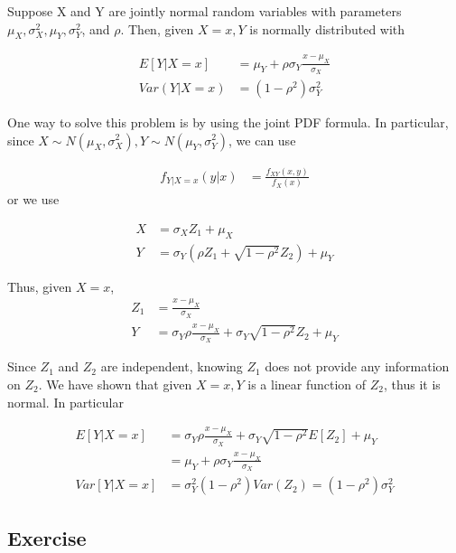 \begin{theorem}
Suppose X and Y are jointly normal random variables with parameters $\mu_X, \sigma^2_X, \mu_Y, \sigma^2_Y$, and $ \rho $. Then, given $X=x, Y$ is normally distributed with

\begin{align*}
	E[Y|X=x] &= \mu_Y + \rho \sigma_Y \frac{x-\mu_X}{\sigma_X} \\
	Var(Y|X=x) &= (1- \rho^2) \sigma^2_Y
\end{align*}

\end{theorem}

One way to solve this problem is by using the joint PDF formula. In particular, since $X \sim N(\mu_X, \sigma^2_X), Y \sim N(\mu_Y, \sigma^2_Y)$, we can use

\begin{align*}
	f_{Y|X=x} (y|x) &= \frac{f_{XY} (x, y)}{f_X(x)}
\end{align*}
or we use

\begin{align*}
	X &= \sigma_X Z_1 + \mu_X \\
	Y &= \sigma_Y \left(\rho Z_1 + \sqrt{1-\rho^2} Z_2 \right)  + \mu_Y
\end{align*}

Thus, given $X=x$, 
\begin{align*}
	Z_1 &= \frac{x - \mu_X}{\sigma_X} \\
	Y &= \sigma_Y \rho \frac{x- \mu_X}{\sigma_X} + \sigma_Y \sqrt{1- \rho^2} Z_2 + \mu_Y 
\end{align*}

Since $Z_1$ and $Z_2$ are independent, knowing $Z_1$ does not provide any information on $Z_2$. We have shown that given $X=x, Y$ is a linear function of $Z_2$, thus it is normal. In particular

\begin{align*}
	E[Y|X=x] &= \sigma_Y \rho \frac{x- \mu_X}{\sigma_X} + \sigma_Y \sqrt{1- \rho^2} E[Z_2] + \mu_Y  \\
	 &= \mu_Y + \rho \sigma_Y \frac{x-\mu_X}{\sigma_X} \\
	Var[Y|X=x] &= \sigma_Y^2 (1- \rho^2) Var(Z_2) = (1- \rho^2) \sigma_Y^2
\end{align*}

\clearpage

\subsection{Exercise}

